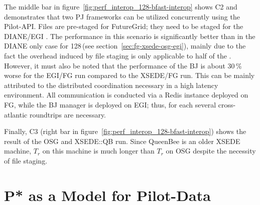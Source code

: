 \documentclass{sig-alternate}
\begin{document}
The middle bar in figure~\ref{fig:perf_interop_128-bfast-interop}
shows C2 and demonstrates that two PJ frameworks can be utilized
concurrently using the Pilot-API. Files are pre-staged for FutureGrid;
they need to be staged for the DIANE/EGI \cus. The performance in this
scenario is significantly better than in the DIANE only case for
128\,\cus (see section~\ref{sec:fg-xsede-osg-egi}), mainly due to the
fact the overhead induced by file staging is only applicable to half
of the \cus. However, it must also be noted that the performance of
the BJ \pilot is about 30\,\% worse for the EGI/FG run compared to the
XSEDE/FG run.  This can be mainly attributed to the distributed
coordination necessary in a high latency environment. All
communication is conducted via a Redis instance deployed on FG, while
the BJ manager is deployed on EGI; thus, for each \cu several
cross-atlantic roundtrips are necessary.

Finally, C3 (right bar in
figure~\ref{fig:perf_interop_128-bfast-interop}) shows the result of
the OSG and XSEDE::QB run. Since QueenBee is an older XSEDE machine,
$T_r$ on this machine is much longer than $T_r$ on OSG despite the
necessity of file staging.




\section{P* as a Model for Pilot-Data}
\label{sec:pilot-data}


\end{document}
